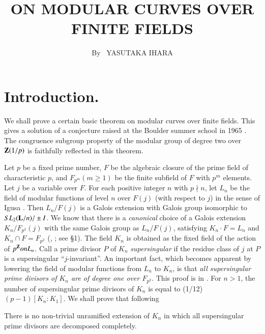 
\title{ON MODULAR CURVES OVER FINITE FIELDS}

\author{By~ YASUTAKA IHARA}

\date{}
\maketitle


\setcounter{page}{171}
\setcounter{pageoriginal}{160}

\section*{Introduction.}\pageoriginale We shall prove a certain basic theorem on modular curves over finite fields. This gives a solution of a conjecture raised at the Boulder summer school in 1965 \cite{art6-key7}. The congruence subgroup property of the modular group of degree two over $\mathbf{Z}(1/p)$ is faithfully reflected in this theorem.

Let $p$ be a fixed prime number, $F$ be the algebraic closure of the prime field of characteristic $p$, and $F_{p^m} (m \geqslant 1)$ be the finite subfield of $F$ with $p^m$ elements. Let $j$ be a variable over $F$. For each positive integer $n$ with $p\nmid n$, let $L_n$ be the field of modular functions of level $n$ over $F(j)$ (with respect to $j$) in the sense of Igusa \cite{art6-key5}. Then $L_n / F (j)$ is a Galois extension with Galois group isomorphic to $SL_2 (\mathbf{L}/ n) / \pm I$. We know that there is a \textit{canonical} choice of a Galois extension $K_n / F_{p^2} (j)$ with the same Galois group as $L_n / F(j)$, satisfying $K_n \cdot F= L_n$ and $K_n \cap F = F_{p^2}$ (\cite{art6-key7}, \cite{art6-key8}; see \S 1). The field $K_n$ is obtained as the fixed field of the action of $p^{\mathbf{Z}} on L_n$. Call a prime divisor $P$ of $K_n$ \textit{supersingular} if the residue class of $j$ at $P$ is a supersingular ``$j$-invariant''. An important fact, which becomes apparent by lowering the field of modular functions from $L_n$ to $K_n$, is that \textit{all supersingular prime divisors of $K_n$ are of degree one over $F_{p^2}$}. This proof is in \cite{art6-key8}. For $n > 1$, the number of supersingular prime divisors of $K_n$ is equal to (1/12) $(p-1) [K_n: K_1]$. We shall prove that following 

\begin{theorem*}
There is no non-trivial unramified extension of $K_n$ in which all supersingular prime divisors are decomposed completely.
\end{theorem*}

